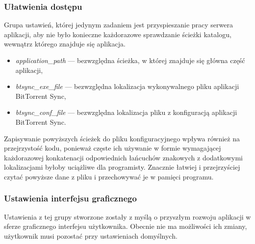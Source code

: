 \documentclass[polish,a4paper,twoside]{ppfcmthesis}
\begin{document}
\subsubsection*{Ułatwienia dostępu}

Grupa ustawień, której jedynym zadaniem jest przyspieszanie pracy serwera aplikacji, aby nie było konieczne każdorazowe sprawdzanie ścieżki katalogu, wewnątrz którego znajduje się aplikacja.

\begin{itemize}[noitemsep]
  \item \emph{application\_path} --- bezwzględna ścieżka, w której znajduje się główna część aplikacji,
  \item \emph{btsync\_exe\_file} --- bezwzględna lokalizacja wykonywalnego pliku aplikacji BitTorrent Sync,
  \item \emph{btsync\_conf\_file} --- bezwzględna lokalizacja pliku z konfiguracją aplikacji BitTorrent Sync.
\end{itemize}

Zapisywanie powyższych ścieżek do pliku konfiguracyjnego wpływa również na przejrzystość kodu, ponieważ częste ich używanie w formie wymagającej każdorazowej konkatenacji odpowiednich łańcuchów znakowych z dodatkowymi lokalizacjami byłoby uciążliwe dla programisty. Znacznie łatwiej i przejrzyściej czytać powyższe dane z pliku i przechowywać je w pamięci programu.

\subsubsection*{Ustawienia interfejsu graficznego}

Ustawienia z tej grupy stworzone zostały z myślą o przyszłym rozwoju aplikacji w sferze graficznego interfejsu użytkownika. Obecnie nie ma możliwości ich zmiany, użytkownik musi pozostać przy ustawieniach domyślnych.
\end{document}
